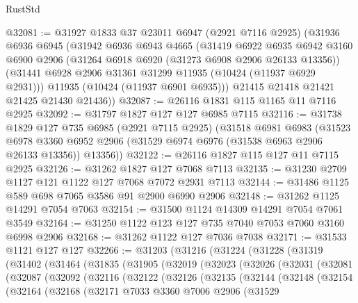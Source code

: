 \begin{lexlean}{RustStd}
\begin{coremodule}
@32081 := @31927
    @1833
    @37
    @23011
    @6947
    (@2921 @7116 @2925)
    (@31936
      @6936
      @6945
      (@31942
        @6936
        @6943
        @4665
        (@31419
          @6922
          @6935
          @6942
          @3160
          @6900
          @2906
          (@31264 @6918 @6920 (@31273 @6908 @2906 @26133 @13356))
          (@31441 @6928 @2906 @31361 @31299 @11935 (@10424 (@11937 @6929 @2931)))
          @11935
          (@10424 (@11937 @6901 @6935)))
        @21415
        @21418
        @21421
        @21425
        @21430
        @21436))
@32087 := @26116 @1831 @115 @1165 @11 @7116 @2925
@32092 := @31797 @1827 @127 @127 @6985 @7115
@32116 := @31738
    @1829
    @127
    @735
    @6985
    (@2921 @7115 @2925)
    (@31518
      @6981
      @6983
      (@31523
        @6978
        @3360
        @6952
        @2906
        (@31529 @6974 @6976 (@31538 @6963 @2906 @26133 @13356))
        @13356))
@32122 := @26116 @1827 @115 @127 @11 @7115 @2925
@32126 := @31262 @1827 @127 @7068 @7113
@32135 := @31230 @2709 @1127 @121 @1122 @127 @7068 @7072 @2931 @7113
@32144 := @31486 @1125 @589 @698 @7065 @3586 @91 @2900 @6990 @2906
@32148 := @31262 @1125 @14291 @7054 @7063
@32154 := @31500 @1124 @14309 @14291 @7054 @7061 @3549
@32164 := @31250 @1122 @123 @127 @735 @7040 @7053 @7060 @3160 @6998 @2906
@32168 := @31262 @1122 @127 @7036 @7038
@32171 := @31533 @1121 @127 @127
@32266 := @31203
    (@31216
      (@31224
        (@31228
          (@31319
            (@31402
              (@31464
                (@31835
                  (@31905
                    (@32019
                      (@32023
                        (@32026
                          (@32031
                            (@32081
                              (@32087
                                (@32092
                                  (@32116
                                    (@32122
                                      (@32126
                                        (@32135
                                          (@32144
                                            (@32148
                                              (@32154
                                                (@32164
                                                  (@32168
                                                    (@32171
                                                      @7033
                                                      @3360
                                                      @7006
                                                      @2906
                                                      (@31529

\end{coremodule}
\end{lexlean}
